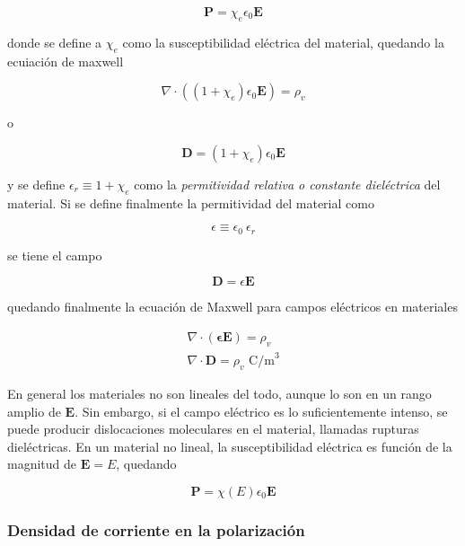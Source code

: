 \begin{equation*}
\mathbf{P} = \chi_e \epsilon_0 \mathbf{E}
\end{equation*}

donde se define a $\chi_e$ como la susceptibilidad eléctrica del material, quedando la ecuiación de maxwell

\begin{equation*}
\nabla \cdot ((1 + \chi_e)\epsilon_0 \mathbf{E}) = \rho_v
\end{equation*}


 o 

 \begin{equation*}
\mathbf{D} = (1 + \chi_e)\epsilon_0 \mathbf{E}
 \end{equation*}

y se define $\epsilon_r \equiv 1 + \chi_e$ como la \textit{permitividad relativa o constante dieléctrica} del material. Si se define finalmente la permitividad del material como

\begin{equation*}
\epsilon \equiv \epsilon_0 \ \epsilon_r
\end{equation*}

se tiene el campo 

\begin{equation*}
\mathbf{D} = \epsilon \mathbf{E}
\end{equation*}

quedando finalmente la ecuación de Maxwell para campos eléctricos en materiales

\begin{eqnarray*}
\nabla \cdot \mathbf{(\epsilon \mathbf{E})} = \rho_v \\
\nabla \cdot \mathbf{D} = \rho_v \text{ C/m}^3
\end{eqnarray*}


En general los materiales no son lineales del todo, aunque lo son en un rango amplio de $\mathbf{E}$. Sin embargo, si el campo eléctrico es lo suficientemente intenso, se puede producir dislocaciones moleculares en el material, llamadas rupturas dieléctricas. En un material no lineal, la susceptibilidad eléctrica es función de la magnitud de $\mathbf{E} = E$, quedando 

\begin{equation*}
\mathbf{P} = \chi (E) \epsilon_0 \mathbf{E}
\end{equation*}


\subsubsection{Densidad de corriente en la polarización}

